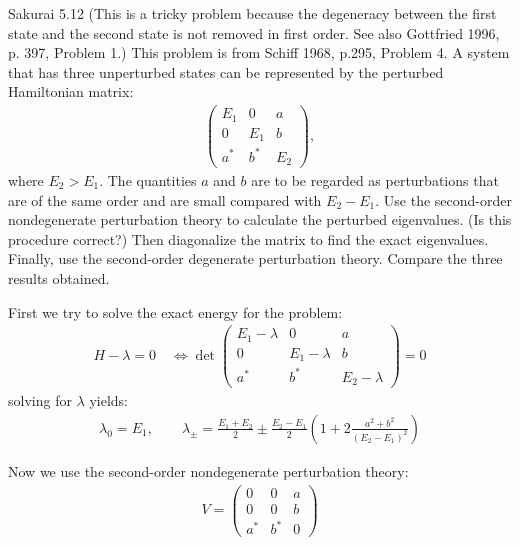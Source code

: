 \documentclass{article}
\begin{document}
	\newpage
	\begin{section}{Sakurai 5.12}
		(This is a tricky problem because the degeneracy between the first state and the second state is not removed in first order. See also Gottfried 1996, p. 397, Problem 1.) This problem is from Schiff 1968, p.295, Problem 4. A system that has three unperturbed states can be represented by the perturbed Hamiltonian matrix:
		\begin{align*}
			\begin{pmatrix}
				E_1 & 0 & a \\
				0 & E_1 & b \\
				a^* & b^* & E_2
			\end{pmatrix},
		\end{align*}
		where $E_2 > E_1$. The quantities $a$ and $b$ are to be regarded as perturbations that are of the same order and are small compared with $E_2 - E_1$. Use the second-order nondegenerate perturbation theory to calculate the perturbed eigenvalues. (Is this procedure correct?) Then diagonalize the matrix to find the exact eigenvalues. Finally, use the second-order degenerate perturbation theory. Compare the three results obtained.

		\begin{tcolorbox}[breakable]
			First we try to solve the exact energy for the problem:
			\begin{align*}
				H - \lambda = 0 \quad \iff \det \begin{pmatrix}
					E_1 - \lambda & 0 & a \\
					0 & E_1 - \lambda & b \\
					a^* & b^* & E_2 - \lambda
				\end{pmatrix} = 0
			\end{align*}
			solving for $\lambda$ yields:
			\begin{align*}
				\lambda_0 = E_1, \qquad
				\lambda_\pm = \frac{E_1 + E_2}{2} \pm \frac{E_2 - E_1}{2} \left( 1 + 2 \frac{a^2 + b^2}{(E_2 - E_1)^2} \right)
			\end{align*}

			Now we use the second-order nondegenerate perturbation theory:
			\begin{align*}
				V = \begin{pmatrix}
					0 & 0 & a \\
					0 & 0 & b \\
					a^* & b^* & 0
				\end{pmatrix}
			\end{align*}


\end{tcolorbox}
\end{section}
\end{document}
